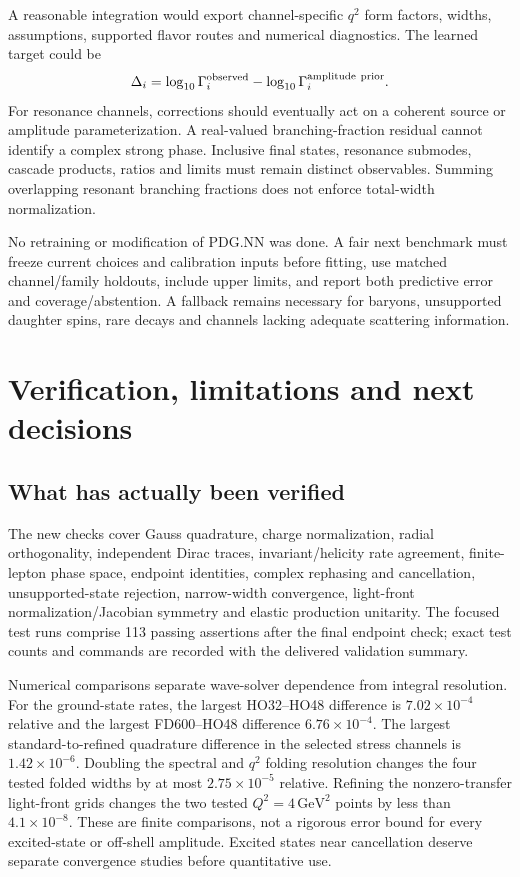 \documentclass[11pt,a4paper]{article}
\newcommand{\GeV}{\,\mathrm{GeV}}
\begin{document}
A reasonable integration would export channel-specific $q^2$ form factors, widths, assumptions, supported flavor routes and numerical diagnostics. The learned target could be
\begin{equation}
 \Delta_i=\log_{10}\Gamma_i^{\rm observed}-\log_{10}\Gamma_i^{\rm amplitude\ prior}.
\end{equation}
For resonance channels, corrections should eventually act on a coherent source or amplitude parameterization. A real-valued branching-fraction residual cannot identify a complex strong phase. Inclusive final states, resonance submodes, cascade products, ratios and limits must remain distinct observables. Summing overlapping resonant branching fractions does not enforce total-width normalization.

No retraining or modification of PDG.NN was done. A fair next benchmark must freeze current choices and calibration inputs before fitting, use matched channel/family holdouts, include upper limits, and report both predictive error and coverage/abstention. A fallback remains necessary for baryons, unsupported daughter spins, rare decays and channels lacking adequate scattering information.

\section{Verification, limitations and next decisions}
\subsection{What has actually been verified}
The new checks cover Gauss quadrature, charge normalization, radial orthogonality, independent Dirac traces, invariant/helicity rate agreement, finite-lepton phase space, endpoint identities, complex rephasing and cancellation, unsupported-state rejection, narrow-width convergence, light-front normalization/Jacobian symmetry and elastic production unitarity. The focused test runs comprise 113 passing assertions after the final endpoint check; exact test counts and commands are recorded with the delivered validation summary.

Numerical comparisons separate wave-solver dependence from integral resolution. For the ground-state rates, the largest HO32--HO48 difference is $7.02\times10^{-4}$ relative and the largest FD600--HO48 difference $6.76\times10^{-4}$. The largest standard-to-refined quadrature difference in the selected stress channels is $1.42\times10^{-6}$. Doubling the spectral and $q^2$ folding resolution changes the four tested folded widths by at most $2.75\times10^{-5}$ relative. Refining the nonzero-transfer light-front grids changes the two tested $Q^2=4\GeV^2$ points by less than $4.1\times10^{-8}$. These are finite comparisons, not a rigorous error bound for every excited-state or off-shell amplitude. Excited states near cancellation deserve separate convergence studies before quantitative use.
\end{document}
